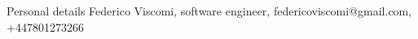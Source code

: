 \documentclass{resume}
\begin{document}
    \begin{rSection}{Personal details}
        Federico Viscomi, software engineer, federicoviscomi@gmail.com, +447801273266




    \end{rSection}

\end{document}
